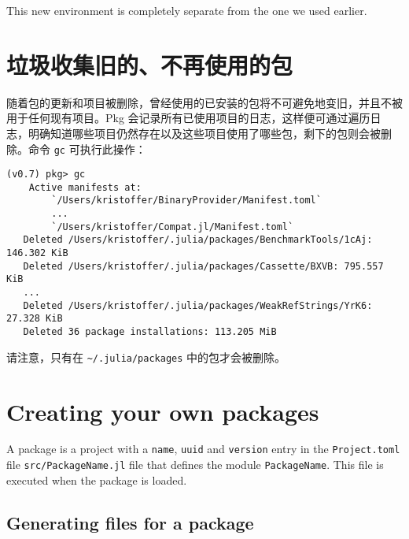 This new environment is completely separate from the one we used earlier.



\hypertarget{5812058120249017191}{}


\section{垃圾收集旧的、不再使用的包}



随着包的更新和项目被删除，曾经使用的已安装的包将不可避免地变旧，并且不被用于任何现有项目。Pkg 会记录所有已使用项目的日志，这样便可通过遍历日志，明确知道哪些项目仍然存在以及这些项目使用了哪些包，剩下的包则会被删除。命令 \texttt{gc} 可执行此操作：




\begin{lstlisting}
(v0.7) pkg> gc
    Active manifests at:
        `/Users/kristoffer/BinaryProvider/Manifest.toml`
        ...
        `/Users/kristoffer/Compat.jl/Manifest.toml`
   Deleted /Users/kristoffer/.julia/packages/BenchmarkTools/1cAj: 146.302 KiB
   Deleted /Users/kristoffer/.julia/packages/Cassette/BXVB: 795.557 KiB
   ...
   Deleted /Users/kristoffer/.julia/packages/WeakRefStrings/YrK6: 27.328 KiB
   Deleted 36 package installations: 113.205 MiB
\end{lstlisting}



请注意，只有在 \texttt{{\textasciitilde}/.julia/packages} 中的包才会被删除。



\hypertarget{5867084990704441204}{}


\section{Creating your own packages}



A package is a project with a \texttt{name}, \texttt{uuid} and \texttt{version} entry in the \texttt{Project.toml} file \texttt{src/PackageName.jl} file that defines the module \texttt{PackageName}. This file is executed when the package is loaded.



\hypertarget{14149589589287981755}{}


\subsection{Generating files for a package}



